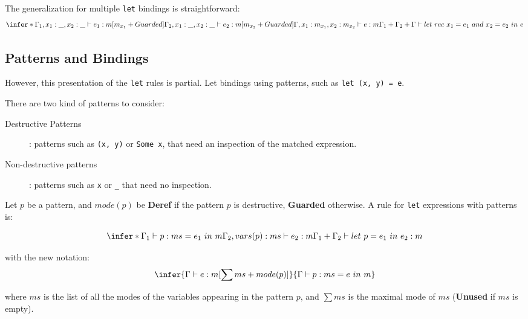\documentclass{article}
\begin{document}
The generalization for multiple \verb"let" bindings is straightforward:
\begin{displaymath}
  \infer*{\Gamma_1, x_1: \_, x_2: \_ \vdash e_1: m[m_{x_1} + Guarded] \\\\
          \Gamma_2, x_1: \_, x_2: \_ \vdash e_2: m[m_{x_2} + Guarded] \\\\
          \Gamma, x_1: m_{x_1}, x_2: m_{x_2} \vdash e: m}
         {\Gamma_1 + \Gamma_2 + \Gamma \vdash
          let~rec~x_1 = e_1~and~x_2 = e_2~in~e}
\end{displaymath}

\subsection{Patterns and Bindings}
However, this presentation of the \verb"let" rules is partial. Let bindings
using patterns, such as \verb"let (x, y) = e".

There are two kind of patterns to consider:
\begin{description}
  \item[Destructive Patterns]: patterns such as \verb"(x, y)" or \verb"Some x",
    that need an inspection of the matched expression.
  \item[Non-destructive patterns]: patterns such as \verb"x" or \verb"_" that
    need no inspection.
\end{description}

Let $p$ be a pattern, and $mode(p)$ be \textbf{Deref} if the pattern $p$ is
destructive, \textbf{Guarded} otherwise. A rule for \verb"let" expressions with
patterns is:

\begin{displaymath}
  \infer*{\Gamma_1 \vdash p: ms=e_1~in~m \\
          \Gamma_2, vars(p): ms \vdash e_2: m}
         {\Gamma_1 + \Gamma_2 \vdash let~p=e_1~in~e_2: m}
\end{displaymath}

with the new notation:
\begin{displaymath}
  \infer{\Gamma \vdash e: m[\sum ms + mode(p)]}
        {\Gamma \vdash p:ms=e~in~m}
\end{displaymath}

where $ms$ is the list of all the modes of the variables appearing in the
pattern $p$, and $\sum ms$ is the maximal mode of $ms$ (\textbf{Unused} if $ms$
is empty).



\end{document}
